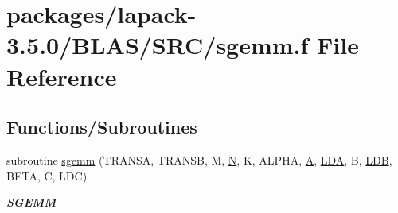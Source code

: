\hypertarget{lapack-3_85_80_2BLAS_2SRC_2sgemm_8f}{}\section{packages/lapack-\/3.5.0/\+B\+L\+A\+S/\+S\+R\+C/sgemm.f File Reference}
\label{lapack-3_85_80_2BLAS_2SRC_2sgemm_8f}
\subsection*{Functions/\+Subroutines}
\begin{DoxyCompactItemize}
\item 
subroutine \hyperlink{group__single__blas__level3_gafe51bacb54592ff5de056acabd83c260}{sgemm} (T\+R\+A\+N\+S\+A, T\+R\+A\+N\+S\+B, M, \hyperlink{polmisc_8c_a0240ac851181b84ac374872dc5434ee4}{N}, K, A\+L\+P\+H\+A, \hyperlink{classA}{A}, \hyperlink{example__user_8c_ae946da542ce0db94dced19b2ecefd1aa}{L\+D\+A}, B, \hyperlink{example__user_8c_a50e90a7104df172b5a89a06c47fcca04}{L\+D\+B}, B\+E\+T\+A, C, L\+D\+C)
\begin{DoxyCompactList}\small\item\em {\bfseries S\+G\+E\+M\+M} \end{DoxyCompactList}\end{DoxyCompactItemize}
